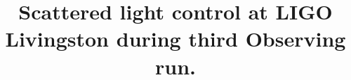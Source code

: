 \documentclass[12pt]{iopart}
\begin{document}






\title{Scattered light control at LIGO Livingston during third Observing run.}




\end{document}
